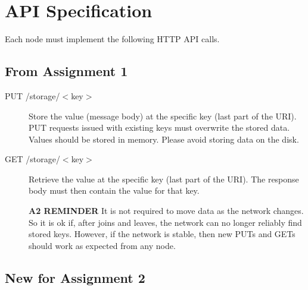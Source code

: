 \documentclass[]{article}
\begin{document}

\appendix

\section{API Specification}
\label{api_spec}

Each node must implement the following HTTP API calls.

\subsection{From Assignment 1}

\begin{description}

    \item [PUT /storage/$<$key$>$]

        Store the value (message body) at the specific key (last part of the URI). PUT requests issued with existing keys must overwrite the stored data.
        Values should be stored in memory.
        Please avoid storing data on the disk.

    \item [GET /storage/$<$key$>$]

        Retrieve the value at the specific key (last part of the URI). The response body must then contain the value for that key.

        \textbf{A2 REMINDER}
        It is not required to move data as the network changes.
        So it is ok if, after joins and leaves, the network can no longer reliably find stored keys.
        However, if the network is stable,
        then new PUTs and GETs should work as expected from any node.

\end{description}

\subsection{New for Assignment 2}
\end{document}
